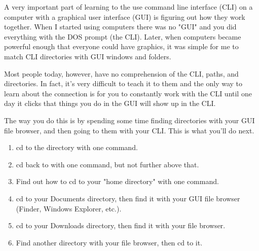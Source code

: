 A very important part of learning to the use command line interface (CLI) on a computer with a
graphical user interface (GUI) is figuring out how they work together.  When I started using
computers there was no "GUI" and you did everything with the DOS prompt (the CLI).  Later, when
computers became powerful enough that everyone could have graphics, it was simple for me
to match CLI directories with GUI windows and folders.

Most people today, however, have no comprehension of the CLI, paths, and directories.
In fact, it's very difficult to teach it to them and the only way to learn about the
connection is for you to constantly work with the CLI until one day it clicks that 
things you do in the GUI will show up in the CLI.

The way you do this is by spending some time finding directories with your GUI file browser, 
and then going to them with your CLI.  This is what you'll do next.

\begin{enumerate}
\item cd to the  directory with one command.
\item cd back to  with one command, but not further above that.
\item Find out how to cd to your "home directory" with one command.
\item cd to your Documents directory, then find it with your GUI file browser (Finder, Windows Explorer, etc.).
\item cd to your Downloads directory, then find it with your file browser.
\item Find another directory with your file browser, then cd to it.
\end{enumerate}


